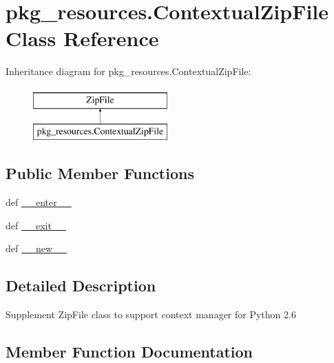 \hypertarget{classpkg__resources_1_1ContextualZipFile}{}\section{pkg\+\_\+resources.\+Contextual\+Zip\+File Class Reference}
\label{classpkg__resources_1_1ContextualZipFile}
Inheritance diagram for pkg\+\_\+resources.\+Contextual\+Zip\+File\+:\begin{figure}[H]
\begin{center}
\leavevmode
\includegraphics[height=2.000000cm]{classpkg__resources_1_1ContextualZipFile}
\end{center}
\end{figure}
\subsection*{Public Member Functions}
\begin{DoxyCompactItemize}
\item 
def \hyperlink{classpkg__resources_1_1ContextualZipFile_a064407cab202db7794122336cd328087}{\+\_\+\+\_\+enter\+\_\+\+\_\+}
\item 
def \hyperlink{classpkg__resources_1_1ContextualZipFile_a06064938036852db4fc67496738aa0ab}{\+\_\+\+\_\+exit\+\_\+\+\_\+}
\item 
def \hyperlink{classpkg__resources_1_1ContextualZipFile_a4c3e9984a182f8ede63a69db3d37d7ba}{\+\_\+\+\_\+new\+\_\+\+\_\+}
\end{DoxyCompactItemize}


\subsection{Detailed Description}
\begin{DoxyVerb}Supplement ZipFile class to support context manager for Python 2.6
\end{DoxyVerb}
 

\subsection{Member Function Documentation}
\hypertarget{classpkg__resources_1_1ContextualZipFile_a064407cab202db7794122336cd328087}{}
